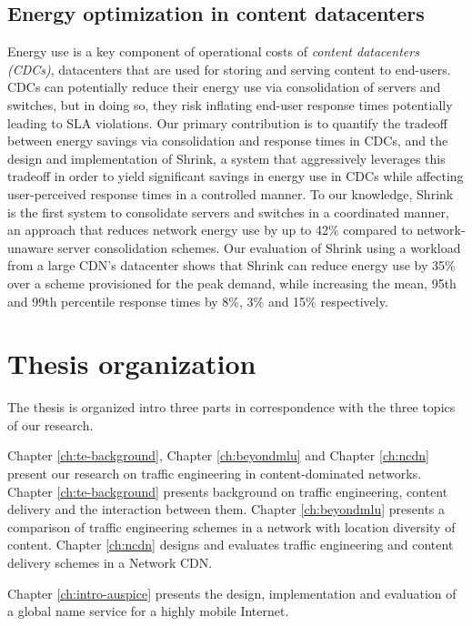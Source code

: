 \subsection{Energy optimization in content datacenters}
Energy use is a key component of operational costs of \emph{content datacenters (CDCs)}, datacenters that are used for storing and serving content to end-users. CDCs can potentially reduce their energy use via consolidation of servers and switches, but in doing so, they risk inflating end-user response times potentially leading to SLA violations. Our primary contribution is to quantify the tradeoff between energy savings via consolidation and response times in CDCs, and the design and implementation of Shrink, a system that aggressively leverages this tradeoff in order to yield significant savings in energy use in CDCs while affecting user-perceived response times in a controlled manner. To our knowledge, Shrink is the first system to consolidate servers and switches in a coordinated manner, an approach that reduces network energy use by up to 42\% compared to network-unaware server consolidation schemes. Our evaluation of Shrink using a workload from a large CDN's datacenter shows that Shrink can reduce energy use by 35\% over a scheme provisioned for the peak demand, while increasing the mean, 95th and 99th percentile response times by 8\%, 3\% and 15\% respectively.



\section{Thesis organization}

The thesis is organized intro three parts in correspondence with the three topics of our research.

Chapter \ref{ch:te-background}, Chapter \ref{ch:beyondmlu} and Chapter \ref{ch:ncdn} present our research on traffic engineering in content-dominated networks. Chapter \ref{ch:te-background} presents background on traffic engineering, content delivery and the interaction between them. Chapter \ref{ch:beyondmlu} presents a comparison of traffic engineering schemes in a network with location diversity of content. Chapter \ref{ch:ncdn} designs and evaluates traffic engineering and content delivery schemes in a Network CDN.

Chapter \ref{ch:intro-auspice} presents the design, implementation and evaluation of a global name service for a highly mobile Internet.

